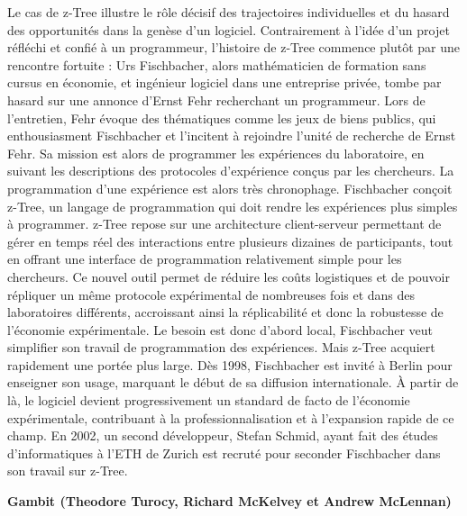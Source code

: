 Le cas de z-Tree illustre le rôle décisif des trajectoires individuelles et du hasard des opportunités dans la genèse d’un logiciel. Contrairement à l’idée d’un projet réfléchi et confié à un programmeur, l’histoire de z-Tree commence plutôt par une rencontre fortuite : Urs Fischbacher, alors mathématicien de formation sans cursus en économie, et ingénieur logiciel dans une entreprise privée, tombe par hasard sur une annonce d’Ernst Fehr recherchant un programmeur. Lors de l’entretien, Fehr évoque des thématiques comme les jeux de biens publics, qui enthousiasment Fischbacher et l’incitent à rejoindre l'unité de recherche de Ernst Fehr. Sa mission est alors de programmer les expériences du laboratoire, en suivant les descriptions des protocoles d'expérience conçus par les chercheurs. La programmation d'une expérience est alors très chronophage. Fischbacher conçoit z-Tree, un langage de programmation qui doit rendre les expériences plus simples à programmer. z-Tree repose sur une architecture client-serveur permettant de gérer en temps réel des interactions entre plusieurs dizaines de participants, tout en offrant une interface de programmation relativement simple pour les chercheurs. Ce nouvel outil permet de réduire les coûts logistiques et de pouvoir répliquer un même protocole expérimental de nombreuses fois et dans des laboratoires différents, accroissant ainsi la réplicabilité et donc la robustesse de l'économie expérimentale. Le besoin est donc d'abord local, Fischbacher veut simplifier son travail de programmation des expériences. Mais z-Tree acquiert rapidement une portée plus large. Dès 1998, Fischbacher est invité à Berlin pour enseigner son usage, marquant le début de sa diffusion internationale. À partir de là, le logiciel devient progressivement un standard de facto de l’économie expérimentale, contribuant à la professionnalisation et à l’expansion rapide de ce champ. En 2002, un second développeur, Stefan Schmid, ayant fait des études d'informatiques à l'ETH de Zurich est recruté pour seconder Fischbacher dans son travail sur z-Tree.



\textbf{Gambit (Theodore Turocy, Richard McKelvey et Andrew McLennan)}

